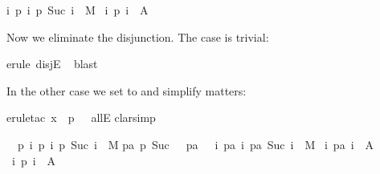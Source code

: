 \begin{isabellebody}
\begin{isamarkuptxt}
\begin{isabelle}
i{\isachardot}\ {\isacharparenleft}p\ i{\isacharcomma}\ p\ {\isacharparenleft}Suc\ i{\isacharparenright}{\isacharparenright}\ {\isasymin}\ M{\isasymrbrakk}\isanewline
{}\ {\isasymexists}i{\isachardot}\ p\ i\ {\isasymin}\ A%
\end{isabelle}
Now we eliminate the disjunction. The case  is trivial:%
\end{isamarkuptxt}%
\isamarkuptrue%
erule\ disjE{\isacharparenright}\isanewline
\ \isamarkupfalse%
blast{\isacharparenright}\isamarkupfalse%
%
\begin{isamarkuptxt}%
\noindent
In the other case we set  to  and simplify matters:%
\end{isamarkuptxt}%
\isamarkuptrue%
erule{\isacharunderscore}tac\ x\ {\isacharequal}\ {\isachardoublequote}p\ {}{\isachardoublequote}\ \ allE{\isacharparenright}\isanewline
\isamarkupfalse%
clarsimp{\isacharparenright}\isamarkupfalse%
%
\begin{isamarkuptxt}%
\begin{isabelle}%
\ {}{\isachardot}\ {\isasymAnd}p{\isachardot}\ {\isasymlbrakk}{\isasymforall}i{\isachardot}\ {\isacharparenleft}p\ i{\isacharcomma}\ p\ {\isacharparenleft}Suc\ i{\isacharparenright}{\isacharparenright}\ {\isasymin}\ M{\isacharsemicolon}\isanewline
{}pa{\isachardot}\ p\ {\isacharparenleft}Suc\ {}{\isacharparenright}\ {\isacharequal}\ pa\ {}\ {\isasymand}\ {\isacharparenleft}{\isasymforall}i{\isachardot}\ {\isacharparenleft}pa\ i{\isacharcomma}\ pa\ {\isacharparenleft}Suc\ i{\isacharparenright}{\isacharparenright}\ {\isasymin}\ M{\isacharparenright}\ {\isasymlongrightarrow}\isanewline
{}i{\isachardot}\ pa\ i\ {\isasymin}\ A{\isacharparenright}{\isasymrbrakk}\isanewline
{}\ {\isasymexists}i{\isachardot}\ p\ i\ {\isasymin}\ A%

\end{isabelle}
\end{isamarkuptxt}
\end{isabellebody}
